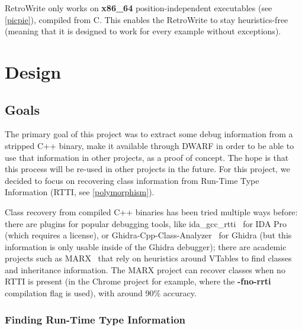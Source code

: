 \documentclass[a4paper,11pt,oneside]{report}
\begin{document}
RetroWrite only works on \textbf{x86\_64} position-independent executables
(see \autoref{picpie}), compiled from C. This enables the RetroWrite to stay
heuristics-free (meaning that it is designed to work for every example without
exceptions).


\chapter{Design}



\section{Goals}

The primary goal of this project was to extract some debug information from a
stripped C++ binary, make it available through DWARF in order to be able to
use that information in other projects, as a proof of concept.
The hope is that this process will be re-used in other projects in the future.
For this project, we decided to focus on recovering class information from
Run-Time Type Information (RTTI, see \autoref{polymorphism}).

Class recovery from compiled C++ binaries has been tried multiple ways before:
there are plugins for popular debugging tools, like 
ida\_gcc\_rtti~\cite{idagccrtti} for IDA Pro (which requires a license),
or Ghidra-Cpp-Class-Analyzer~\cite{ghidracppclassanalyzer} for Ghidra
(but this information is only usable inside of the Ghidra debugger);
there are academic projects such as MARX~\cite{marx} that rely on heuristics 
around VTables to find classes and inheritance information.
The MARX project can recover classes when no RTTI is present (in the Chrome 
project for example, where the \textbf{-fno-rrti} compilation flag is used),
with around 90\% accuracy.

\subsection{Finding Run-Time Type Information}
\end{document}
